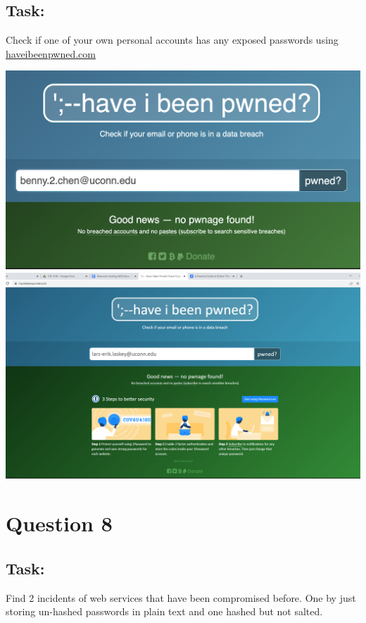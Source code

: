 \documentclass{article}
\begin{document}
\subsection*{Task:}
Check if one of your own personal accounts has any exposed passwords using 
\href{https://haveibeenpwned.com/}{haveibeenpwned.com}

\begin{center}
    \includegraphics[scale=.5]{images/account_check.png}
    \includegraphics[scale=.245]{images/account_check2.png}
\end{center}

\section{Question 8}
\subsection*{Task:}
Find 2 incidents of web services that have been compromised before.
One by just storing un-hashed passwords in plain text and one hashed but not salted.
\end{document}
